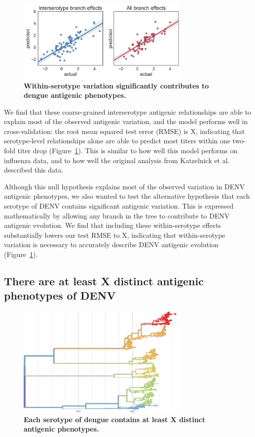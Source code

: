 \documentclass[11pt,oneside,letterpaper]{article}
\begin{document}
\begin{figure}[h]
 \centering
	\includegraphics[width=0.75\textwidth]{figs/test_error.png}
	\caption{\textbf{
Within-serotype variation significantly contributes to dengue antigenic phenotypes.
}}
	\label{test_error}
\end{figure}

We find that these coarse-grained interserotype antigenic relationships are able to explain most of the observed antigenic variation, and the model performs well in cross-validation: the root mean squared test error (RMSE) is X, indicating that serotype-level relationships alone are able to predict most titers within one two-fold titer drop (Figure~\ref{test_error}).
This is similar to how well this model performs on influenza data, and to how well the original analysis from Katzelnick et al. described this data.

Although this null hypothesis explains most of the observed variation in DENV antigenic phenotypes, we also wanted to test the alternative hypothesis that each serotype of DENV contains significant antigenic variation.
This is expressed mathematically by allowing any branch in the tree to contribute to DENV antigenic evolution.
We find that including these within-serotype effects substantially lowers our test RMSE to X, indicating that within-serotype variation is necessary to accurately describe DENV antigenic evolution (Figure~\ref{test_error}).

\subsection*{There are at least X distinct antigenic phenotypes of DENV}
\begin{figure}[h]
 \centering
	\includegraphics[width=0.75\textwidth]{figs/tree.png}
	\caption{\textbf{
Each serotype of dengue contains at least X distinct antigenic phenotypes.
}}
	\label{tree}
\end{figure}
\end{document}
